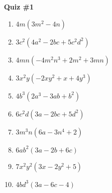 \begin{center}
\textbf{Quiz \#1}
\end{center} 

\vspce

\begin{enumerate}
\item \hspce  $4m(3m^2-4n) $
% 
\item \hspce $3c^2(4a^2-2bc+5c^2d^2)$
% 
\item \hspce $4mn(-4m^2n^3+2m^2+3mn)$
% 
\item \hspce $3 x^{2} y \left(- 2 x y^{2} + x + 4 y^{3}\right)$
% 
\item \hspce $4 b^{3} \left(2 a^{3} - 3 a b + b^{2}\right) $
%                                   

\item \hspce $6c^2d(3a-2bc+5d^2)$
% 

\item \hspce $3 m^{3} n \left(6 a - 3 n^{4} + 2\right)$
% 


\item \hspce $6ab^2(3a-2b+6c) $
% 

\item \hspce $7 x^{2} y^{2} \left(3 x - 2 y^{2} + 5\right) $
%                                   

\item \hspce $4 b d^{3} \left(3 a - 6 c - 4\right)$
% 


\end{enumerate}